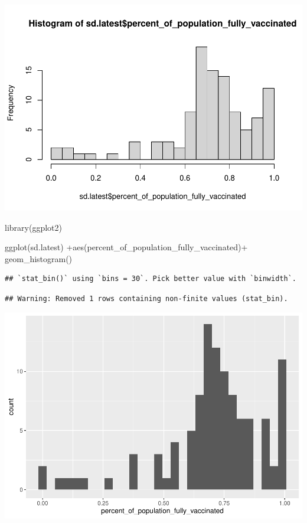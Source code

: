 \documentclass[
]{article}
\newenvironment{Shaded}{\begin{snugshade}}{\end{snugshade}}
\newcommand{\FunctionTok}[1]{\textcolor[rgb]{0.00,0.00,0.00}{#1}}
\newcommand{\NormalTok}[1]{#1}
\newcommand{\SpecialCharTok}[1]{\textcolor[rgb]{0.00,0.00,0.00}{#1}}
\begin{document}
\includegraphics{COVID19-Vax-mini-project_files/figure-latex/unnamed-chunk-26-1.pdf}

\begin{Shaded}
\begin{Highlighting}[]
\FunctionTok{library}\NormalTok{(ggplot2)}

\FunctionTok{ggplot}\NormalTok{(sd.latest) }\SpecialCharTok{+}\FunctionTok{aes}\NormalTok{(percent\_of\_population\_fully\_vaccinated)}\SpecialCharTok{+} \FunctionTok{geom\_histogram}\NormalTok{()}
\end{Highlighting}
\end{Shaded}

\begin{verbatim}
## `stat_bin()` using `bins = 30`. Pick better value with `binwidth`.
\end{verbatim}

\begin{verbatim}
## Warning: Removed 1 rows containing non-finite values (stat_bin).
\end{verbatim}

\includegraphics{COVID19-Vax-mini-project_files/figure-latex/unnamed-chunk-27-1.pdf}
\end{document}
